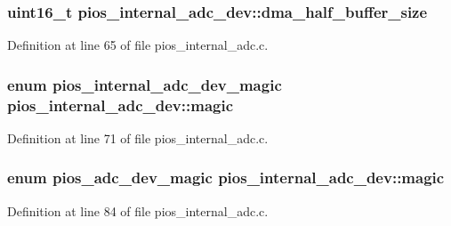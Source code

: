\hypertarget{structpios__internal__adc__dev_a3be0e8830e824f443335f5b981cfec88}{
\subsubsection[{dma\-\_\-half\-\_\-buffer\-\_\-size}]{\setlength{\rightskip}{0pt plus 5cm}uint16\-\_\-t {\bf pios\-\_\-internal\-\_\-adc\-\_\-dev\-::dma\-\_\-half\-\_\-buffer\-\_\-size}}}\label{structpios__internal__adc__dev_a3be0e8830e824f443335f5b981cfec88}


\-Definition at line 65 of file pios\-\_\-internal\-\_\-adc.\-c.

\hypertarget{structpios__internal__adc__dev_afef56391fe33eb2b35a4998a7b9e233c}{
\subsubsection[{magic}]{\setlength{\rightskip}{0pt plus 5cm}enum {\bf pios\-\_\-internal\-\_\-adc\-\_\-dev\-\_\-magic} {\bf pios\-\_\-internal\-\_\-adc\-\_\-dev\-::magic}}}\label{structpios__internal__adc__dev_afef56391fe33eb2b35a4998a7b9e233c}


\-Definition at line 71 of file pios\-\_\-internal\-\_\-adc.\-c.

\hypertarget{structpios__internal__adc__dev_a9bc3075d03c772583c971837fcc3e074}{
\subsubsection[{magic}]{\setlength{\rightskip}{0pt plus 5cm}enum {\bf pios\-\_\-adc\-\_\-dev\-\_\-magic} {\bf pios\-\_\-internal\-\_\-adc\-\_\-dev\-::magic}}}\label{structpios__internal__adc__dev_a9bc3075d03c772583c971837fcc3e074}


\-Definition at line 84 of file pios\-\_\-internal\-\_\-adc.\-c.

